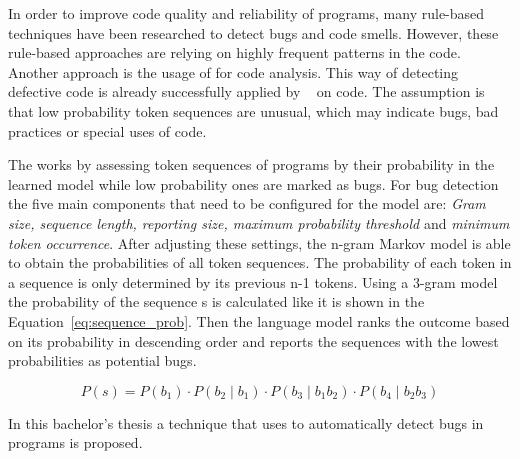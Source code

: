 In order to improve code quality and reliability of programs, many rule-based techniques have been researched to detect bugs and code smells. However, these rule-based approaches are relying on highly frequent patterns in the code. Another approach is the usage of  for code analysis. This way of detecting defective code is already successfully applied by \bugram{}~\cite{bugram} on \java{} code. The assumption is that low probability token sequences are unusual, which may indicate bugs, bad practices or special uses of code. 

The \ngram{} works by assessing token sequences of programs by their probability in the learned model while low probability ones are marked as bugs. For bug detection the five main components that need to be configured for the model are: \textit{Gram size, sequence length, reporting size, maximum probability threshold} and \textit{minimum token occurrence}. After adjusting these settings, the n-gram Markov model is able to obtain the probabilities of all token sequences. The probability of each token in a sequence is only determined by its previous n-1 tokens. Using a 3-gram model the probability of the sequence s is calculated like it is shown in the Equation~\ref{eq:sequence_prob}. Then the language model ranks the outcome based on its probability in descending order and reports the sequences with the lowest probabilities as potential bugs. 
 
\begin{equation} \label{eq:sequence_prob}
P(s) ={} P(b_{1})\cdot P(b_{2}\mid b_{1})\cdot P(b_{3}\mid b_{1}b_{2})\cdot P(b_{4}\mid b_{2}b_{3})
\end{equation}

In this bachelor's thesis a technique that uses  to automatically detect bugs in \scratch{} programs is proposed. 

